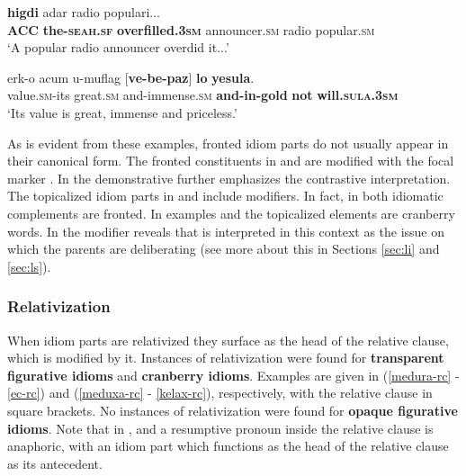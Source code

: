 \documentclass[output=paper]{langsci/langscibook}
\begin{document}
	\ea\label{sea-top}
    	 \textbf{higdi{\shin}} {\shin}adar radio populari...\\
    	   \textbf{ACC} \textbf{the-\textsc{seah}.\textsc{sf}} \textbf{overfilled.\textsc{3sm}} announcer.\textsc{sm} radio popular.\textsc{sm}\\
    	\glt `A popular radio announcer overdid it...'
	\z

	\ea\label{yesula-top}
    	\gll {\ayin}erk-o {\ayin}acum u-muflag [\textbf{ve-be-paz}] \textbf{lo} \textbf{yesula}.\\
    	   value.\textsc{sm}-its great.\textsc{sm} and-immense.\textsc{sm} \textbf{and-in-gold} \textbf{not} \textbf{will.\textsc{sula}.\textsc{3sm}}\\
    	\glt `Its value is great, immense and priceless.'
	\z

As is evident from these examples, fronted idiom parts do not usually appear in their canonical form. The fronted constituents in  and  are modified with the focal marker . In  the demonstrative  further emphasizes the contrastive interpretation. The topicalized idiom parts in  and  include modifiers. In fact, in  both idiomatic complements are fronted. In examples  and  the topicalized elements are cranberry words. In  the modifier  reveals that  is interpreted in this context as the issue on which the parents are deliberating (see more about this in Sections \ref{sec:li} and \ref{sec:ls}).

\subsubsection{Relativization}
\label{sec:relativization}
When idiom parts are relativized they surface as the head of the relative clause, which is modified by it. Instances of relativization were found for \textbf{transparent figurative idioms} and \textbf{cranberry idioms}. Examples are given in (\ref{medura-rc} - \ref{ec-rc}) and (\ref{meduxa-rc} - \ref{kelax-rc}), respectively, with the relative clause in square brackets. No instances of relativization were found for \textbf{opaque figurative idioms}.
Note that in ,  and  a resumptive pronoun inside the relative clause is anaphoric, with an idiom part which functions as the head of the relative clause as its antecedent.
\end{document}
